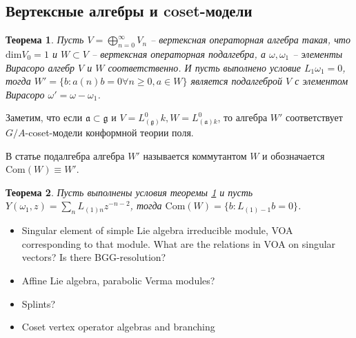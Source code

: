 \documentclass[12pt]{article}
\newtheorem{theorem}{Теорема}
\newcommand{\gf}{\mathfrak{g}}
\newcommand{\af}{\mathfrak{a}}
\begin{document}
\subsection{Вертексные алгебры и coset-модели}
\label{sec:coset-models}

\begin{theorem}
\label{thm:cosets}
  Пусть $V=\bigoplus_{n=0}^{\infty} V_n$ -- вертексная операторная алгебра
  такая, что $\mathrm{dim}V_0=1$ и $W\subset V$ -- вертексная операторная
  подалгебра, а $\omega,\omega_1$ -- элементы Вирасоро алгебр $V$ и $W$
  соответственно. И пусть выполнено условие $L_1\omega_1 =0$, тогда $W'=\{b:
  a(n)b=0 \forall n\geq 0, a\in W\}$ является подалгеброй $V$ с элементом
  Вирасоро $\omega'=\omega-\omega_1$.
\end{theorem}
Заметим, что если $\af\subset\gf$ и $V=L^0_{(\gf)}k, W=L^0_{(\af)k}$, то алгебра
$W'$ соответствует $G/A$-coset-модели конформной теории поля. 

В статье \cite{frenkel1992vertex} подалгебра алгебра $W'$ называется коммутантом
$W$ и обозначается $\mathrm{Com}(W)\equiv W'$.
\begin{theorem}
  Пусть выполнены условия теоремы \ref{thm:cosets} и пусть $Y(\omega_1,z)=\sum_n
  L_{(1)n} z^{-n-2}$, тогда $\mathrm{Com}(W)=\{b: L_{(1)-1}b=0\}$. 
\end{theorem}


\begin{itemize}
\item Singular element of simple Lie algebra irreducible module, VOA corresponding to that module.
  What are the relations in VOA on singular vectors? Is there BGG-resolution?
\item Affine Lie algebra, parabolic Verma modules?
\item Splints?
\item Coset vertex operator algebras and branching
\end{itemize}

{}

\end{document}
